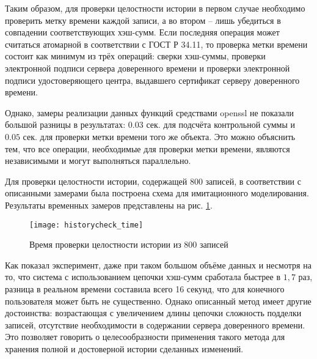 \vspace{\baselineskip}
Таким образом, для проверки целостности истории в первом случае необходимо проверить метку времени каждой записи, а во втором -- лишь убедиться в совпадении соответствующих хэш-сумм. Если последняя операция может считаться атомарной в соответствии с ГОСТ Р 34.11, то проверка метки времени состоит как минимум из трёх операций: сверки хэш-суммы, проверки электронной подписи сервера доверенного времени и проверки электронной подписи удостоверяющего центра, выдавшего сертификат серверу доверенного времени.

\vspace{\baselineskip}
Однако, замеры реализации данных функций средствами openssl не показали большой разницы в результатах: $0.03$ сек. для подсчёта контрольной суммы и $0.05$ сек. для проверки метки времени того же объекта. Это можно объяснить тем, что все операции, необходимые для проверки метки времени, являются независимыми и могут выполняться параллельно.

\vspace{\baselineskip}
Для проверки целостности истории, содержащей 800 записей, в соответствии с описанными замерами была построена схема для имитационного моделирования. Результаты временных замеров представлены на рис. \ref{img:historycheck_time}.

\begin{figure}[h!]
  \centering
  \texttt{[image: historycheck\_time]}
  \caption{Время проверки целостности истории из 800 записей}
  \label{img:historycheck_time}
\end{figure}

\vspace{\baselineskip}
Как показал эксперимент, даже при таком большом объёме данных и несмотря на то, что система с использованием цепочки хэш-сумм сработала быстрее в $1,7$ раз, разница в реальном времени составила всего 16 секунд, что для конечного пользователя может быть не существенно. Однако описанный метод имеет другие достоинства: возрастающая с увеличением длины цепочки сложность подделки записей, отсутствие необходимости в содержании сервера доверенного времени. Это позволяет говорить о целесообразности применения такого метода для хранения полной и достоверной истории сделанных изменений.